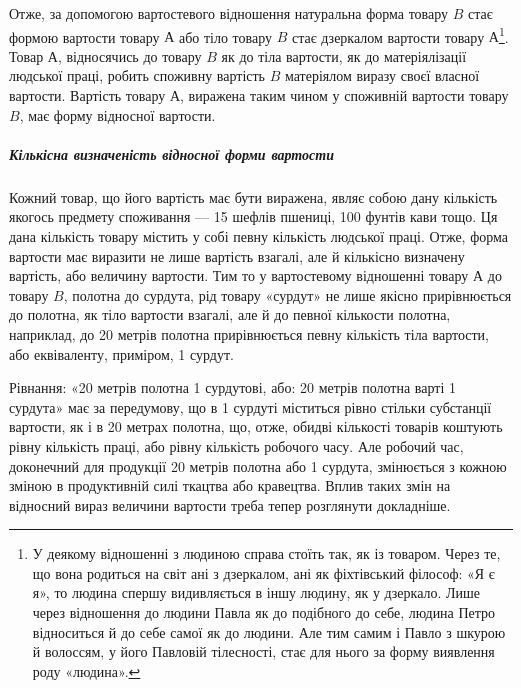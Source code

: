 Отже, за допомогою вартостевого відношення натуральна форма
товару $B$ стає формою вартости товару $А$ або тіло товару $B$
стає дзеркалом вартости товару $А$\footnote{
У деякому відношенні з людиною справа стоїть так, як із товаром.
Через те, що вона родиться на світ ані з дзеркалом, ані як фіхтівський
філософ: «Я є я», то людина спершу видивляється в іншу людину, як у
дзеркало. Лише через відношення до людини Павла як до подібного до
себе, людина Петро відноситься й до себе самої як до людини. Але тим
самим і Павло з шкурою й волоссям, у його Павловій тілесності, стає для
нього за форму виявлення роду «людина».
}. Товар $А$, відносячись до товару
$B$ як до тіла вартости, як до матеріялізації людської праці, робить
споживну вартість $B$ матеріялом виразу своєї власної вартости.
Вартість товару $А$, виражена таким чином у споживній
вартости товару $B$, має форму відносної вартости.

\subparagraph{Кількісна визначеність відносної форми вартости}

Кожний товар, що його вартість має бути виражена, являє собою
дану кількість якогось предмету споживання — 15 шефлів
пшениці, 100 фунтів кави тощо. Ця дана кількість товару містить
у собі певну кількість людської праці. Отже, форма вартости має
виразити не лише вартість взагалі, але й кількісно визначену
вартість, або величину вартости. Тим то у вартостевому відношенні
товару $А$ до товару $B$, полотна до сурдута, рід товару «сурдут»
не лише якісно прирівнюється до полотна, як тіло вартости
взагалі, але й до певної кількости полотна, наприклад, до 20 метрів
полотна прирівнюється певну кількість тіла вартости, або
еквіваленту, приміром, 1 сурдут.

Рівнання: «20 метрів полотна \deq{} 1 сурдутові, або: 20 метрів
полотна варті 1 сурдута» має за передумову, що в 1 сурдуті міститься
рівно стільки субстанції вартости, як і в 20 метрах полотна,
що, отже, обидві кількості товарів коштують рівну кількість
праці, або рівну кількість робочого часу. Але робочий час,
доконечний для продукції 20 метрів полотна або 1 сурдута, змінюється
з кожною зміною в продуктивній силі ткацтва або кравецтва.
Вплив таких змін на відносний вираз величини вартости
треба тепер розглянути докладніше.

